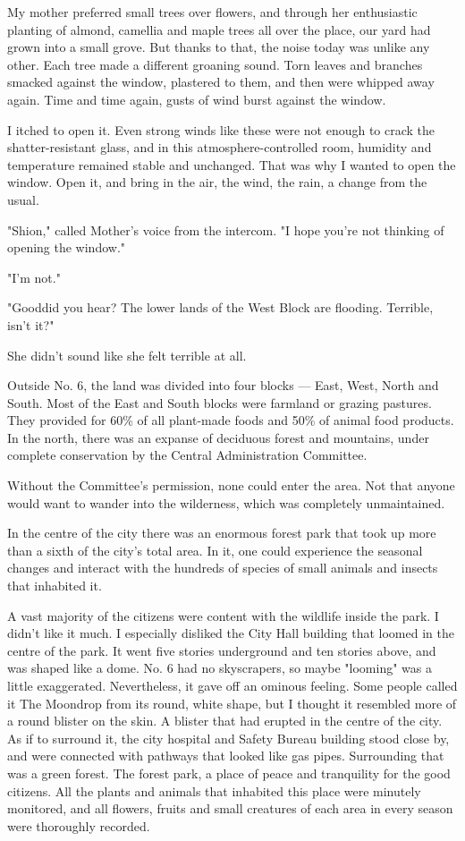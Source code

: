 My mother preferred small trees over flowers, and through her
enthusiastic planting of almond, camellia and maple trees all over the
place, our yard had grown into a small grove. But thanks to that, the
noise today was unlike any other. Each tree made a different groaning
sound. Torn leaves and branches smacked against the window, plastered to
them, and then were whipped away again. Time and time again, gusts of
wind burst against the window.

I itched to open it. Even strong winds like these were not enough to
crack the shatter-resistant glass, and in this atmosphere-controlled
room, humidity and temperature remained stable and unchanged. That was
why I wanted to open the window. Open it, and bring in the air, the
wind, the rain, a change from the usual.

"Shion," called Mother's voice from the intercom. "I hope you're not
thinking of opening the window."

"I'm not."

"Good\el did you hear? The lower lands of the West Block are flooding.
Terrible, isn't it?"

She didn't sound like she felt terrible at all.

Outside No. 6, the land was divided into four blocks --- East, West, North
and South. Most of the East and South blocks were farmland or grazing
pastures. They provided for 60\% of all plant-made foods and 50\% of
animal food products. In the north, there was an expanse of deciduous
forest and mountains, under complete conservation by the Central
Administration Committee.

Without the Committee's permission, none could enter the area. Not that
anyone would want to wander into the wilderness, which was completely
unmaintained.

In the centre of the city there was an enormous forest park that took up
more than a sixth of the city's total area. In it, one could experience
the seasonal changes and interact with the hundreds of species of small
animals and insects that inhabited it.

A vast majority of the citizens were content with the wildlife inside
the park. I didn't like it much. I especially disliked the City Hall
building that loomed in the centre of the park. It went five stories
underground and ten stories above, and was shaped like a dome. No. 6 had
no skyscrapers, so maybe "looming" was a little exaggerated.
Nevertheless, it gave off an ominous feeling. Some people called it The
Moondrop from its round, white shape, but I thought it resembled more of
a round blister on the skin. A blister that had erupted in the centre of
the city. As if to surround it, the city hospital and Safety Bureau
building stood close by, and were connected with pathways that looked
like gas pipes. Surrounding that was a green forest. The forest park, a
place of peace and tranquility for the good citizens. All the plants and
animals that inhabited this place were minutely monitored, and all
flowers, fruits and small creatures of each area in every season were
thoroughly recorded.

